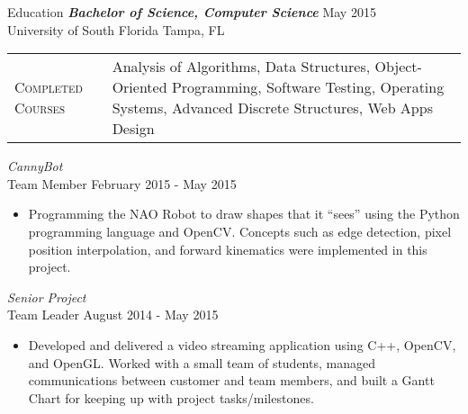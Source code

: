 \begin{section}{Education}
  {\sl \textbf{Bachelor of Science, Computer Science}} \hfill May 2015\\
  University of South Florida \hfill Tampa, FL \\
  \begin{tabularx}{\linewidth}{@{}l X@{}}
    \textsc{Completed Courses} &\small{Analysis of Algorithms, Data Structures, Object-Oriented Programming, Software Testing, Operating Systems, Advanced Discrete Structures, Web Apps Design}\\
  \end{tabularx}
  {\sl CannyBot} \\ Team Member \hfill February 2015 - May 2015
  \begin{itemize}
  \item Programming the NAO Robot to draw shapes that it ``sees'' using the Python programming language and OpenCV. Concepts such as edge detection, pixel position interpolation, and forward kinematics were implemented in this project.
  \end{itemize}
      {\sl Senior Project}  \\ Team Leader \hfill August 2014 - May 2015
      \begin{itemize}
      \item Developed and delivered a video streaming application using C++, OpenCV, and OpenGL. Worked with a small team of students, managed communications between customer and team members, and built a Gantt Chart for keeping up with project tasks/milestones.
      \end{itemize}
\end{section}
